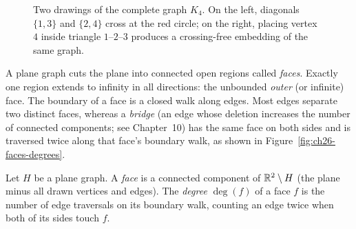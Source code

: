 \begin{figure}[htbp]
\centering
{}
\caption{Two drawings of the complete graph $K_4$. On the left, diagonals $\{1,3\}$ and $\{2,4\}$ cross at the red circle; on the right, placing vertex~$4$ inside triangle $1\text{--}2\text{--}3$ produces a crossing-free embedding of the same graph.}
\label{fig:ch26-k4-embeddings}
\end{figure}

A plane graph cuts the plane into connected open regions called \emph{faces}. Exactly one
region extends to infinity in all directions: the unbounded \emph{outer} (or infinite) face.
The boundary of a face is a closed walk along edges. Most edges separate two distinct faces,
whereas a \emph{bridge} (an edge whose deletion increases the number of connected components;
see Chapter~10) has the same face on both sides and is traversed twice along that face's
boundary walk, as shown in Figure~\ref{fig:ch26-faces-degrees}.

\begin{definition}
\label{ch26:def-face}
Let $H$ be a plane graph. A \emph{face} is a connected component of $\mathbb{R}^2\setminus H$
(the plane minus all drawn vertices and edges). The \emph{degree} $\deg(f)$ of a face
$f$ is the number of edge traversals on its boundary walk, counting an edge twice when both
of its sides touch $f$.
\end{definition}

